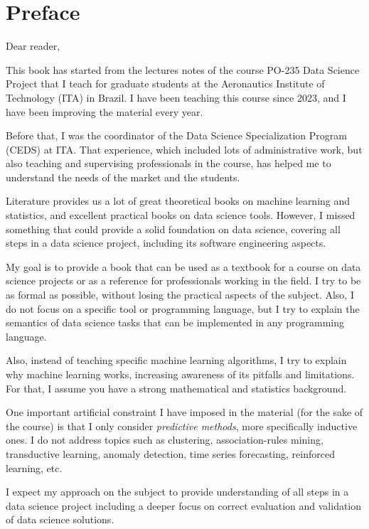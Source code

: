\chapter{Preface}

\noindent Dear reader, \vspace{1em}

This book has started from the lectures notes of the course PO-235 Data Science Project
that I teach for graduate students at the Aeronautics Institute of Technology (ITA) in
Brazil.  I have been teaching this course since 2023, and I have been improving the
material every year.

Before that, I was the coordinator of the Data Science Specialization Program (CEDS) at
ITA.  That experience, which included lots of administrative work, but also teaching and
supervising professionals in the course, has helped me to understand the needs of the
market and the students.

Literature provides us a lot of great theoretical books on machine learning and
statistics, and excellent practical books on data science tools.  However, I missed
something that could provide a solid foundation on data science, covering all steps in a
data science project, including its software engineering aspects.

My goal is to provide a book that can be used as a textbook for a course on data science
projects or as a reference for professionals working in the field.  I try to be as
formal as possible, without losing the practical aspects of the subject.  Also, I do not
focus on a specific tool or programming language, but I try to explain the semantics of
data science tasks that can be implemented in any programming language.

Also, instead of teaching specific machine learning algorithms, I try to explain why
machine learning works, increasing awareness of its pitfalls and limitations.
For that, I assume you have a strong mathematical and statistics background.

One important artificial constraint I have imposed in the material (for the sake of the
course) is that I only consider \emph{predictive methods}, more specifically inductive
ones.  I do not address topics such as clustering, association-rules mining, transductive
learning, anomaly detection, time series forecasting, reinforced learning, etc.

I expect my approach on the subject to provide understanding of all steps in a data science
project including a deeper focus on correct evaluation and validation of data science
solutions.

